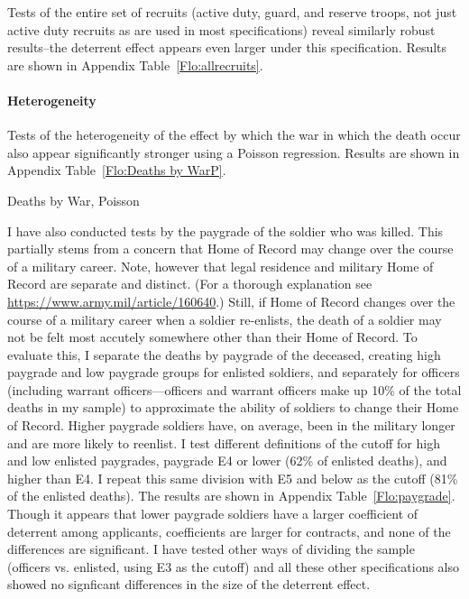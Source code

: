 \documentclass[12pt] {article}
\begin{document}
Tests of the entire set of recruits (active duty, guard, and reserve troops, not just active duty recruits as are used in most specifications) reveal similarly robust results--the deterrent effect appears even larger under this specification. Results are shown in Appendix Table~\ref{Flo:allrecruits}.

\begin{table}
\caption{}
\label{Flo:allrecruits}
\scalebox{0.8}{
}
\end{table}

\paragraph {Heterogeneity}
Tests of the heterogeneity of the effect by which the war in which the death occur also appear significantly stronger using a Poisson regression. Results are shown in Appendix Table~\ref{Flo:Deaths by WarP}.

\begin{table}
\caption{Deaths by War, Poisson}
\label{Flo:Deaths by WarP}

\end{table}

I have also conducted tests by the paygrade of the soldier who was killed. This partially stems from a concern that Home of Record may change over the course of a military career. Note, however that legal residence and military Home of Record are separate and distinct. (For a thorough explanation see \url{https://www.army.mil/article/160640}.) Still, if Home of Record changes over the course of a military career when a soldier re-enlists, the death of a soldier may not be felt most accutely somewhere other than their Home of Record. To evaluate this, I separate the deaths by paygrade of the deceased, creating high paygrade and low paygrade groups for enlisted soldiers, and separately for officers (including warrant officers---officers and warrant officers make up 10\% of the total deaths in my sample) to approximate the ability of soldiers to change their Home of Record. Higher paygrade soldiers have, on average, been in the military longer and are more likely to reenlist. I test different definitions of the cutoff for high and low enlisted paygrades, paygrade E4 or lower (62\% of enlisted deaths), and higher than E4. I repeat this same division with E5 and below as the cutoff (81\% of the enlisted deaths). The results are shown in Appendix Table~\ref{Flo:paygrade}. Though it appears that lower paygrade soldiers have a larger coefficient of deterrent among applicants, coefficients are larger for contracts, and none of the differences are significant. I have tested other ways of dividing the sample (officers vs. enlisted, using E3 as the cutoff) and all these other specifications also showed no signficant differences in the size of the deterrent effect.
\end{document}
